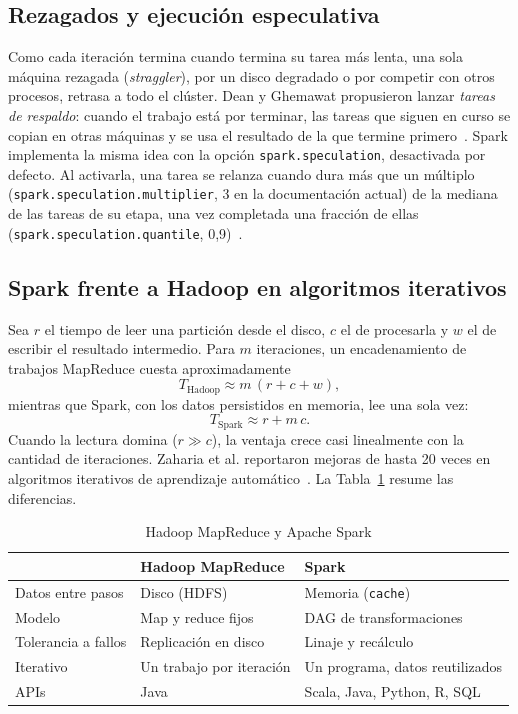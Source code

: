 \documentclass[conference,a4paper]{IEEEtran}
\begin{document}
\subsection{Rezagados y ejecución especulativa}

Como cada iteración termina cuando termina su tarea más lenta, una sola máquina rezagada (\textit{straggler}), por un disco degradado o por competir con otros procesos, retrasa a todo el clúster. Dean y Ghemawat propusieron lanzar \textit{tareas de respaldo}: cuando el trabajo está por terminar, las tareas que siguen en curso se copian en otras máquinas y se usa el resultado de la que termine primero~\cite{dean2004mapreduce}. Spark implementa la misma idea con la opción \texttt{spark.speculation}, desactivada por defecto. Al activarla, una tarea se relanza cuando dura más que un múltiplo (\texttt{spark.speculation.multiplier}, 3 en la documentación actual) de la mediana de las tareas de su etapa, una vez completada una fracción de ellas (\texttt{spark.speculation.quantile}, 0,9)~\cite{spark-config}.

\subsection{Spark frente a Hadoop en algoritmos iterativos}

Sea $r$ el tiempo de leer una partición desde el disco, $c$ el de procesarla y $w$ el de escribir el resultado intermedio. Para $m$ iteraciones, un encadenamiento de trabajos MapReduce cuesta aproximadamente
\begin{equation}
T_{\text{Hadoop}} \approx m\,(r + c + w),
\end{equation}
mientras que Spark, con los datos persistidos en memoria, lee una sola vez:
\begin{equation}
T_{\text{Spark}} \approx r + m\,c .
\end{equation}
Cuando la lectura domina ($r \gg c$), la ventaja crece casi linealmente con la cantidad de iteraciones. Zaharia et al. reportaron mejoras de hasta 20 veces en algoritmos iterativos de aprendizaje automático~\cite{zaharia2012rdd}. La Tabla~\ref{tab:comparacion} resume las diferencias.

\begin{table}[t]
\caption{Hadoop MapReduce y Apache Spark}
\label{tab:comparacion}
\centering
\begin{tabular}{@{}>{\raggedright\arraybackslash}p{1.9cm}>{\raggedright\arraybackslash}p{2.6cm}>{\raggedright\arraybackslash}p{2.6cm}@{}}
\toprule
& \textbf{Hadoop MapReduce} & \textbf{Spark} \\
\midrule
Datos entre pasos & Disco (HDFS) & Memoria (\texttt{cache}) \\
Modelo & Map y reduce fijos & DAG de transformaciones \\
Tolerancia a fallos & Replicación en disco & Linaje y recálculo \\
Iterativo & Un trabajo por iteración & Un programa, datos reutilizados \\
APIs & Java & Scala, Java, Python, R, SQL \\
\bottomrule
\end{tabular}
\end{table}
\end{document}
